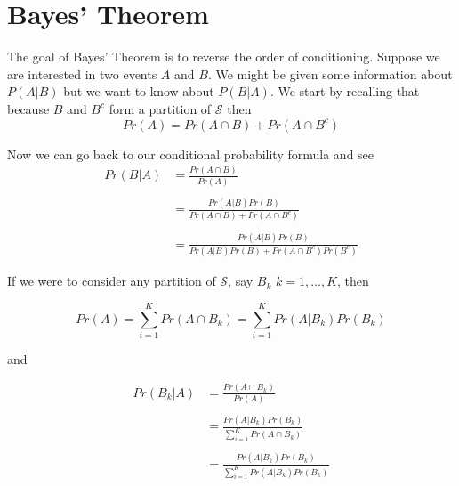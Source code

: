 \documentclass[]{book}
\begin{document}
\section{Bayes' Theorem}\label{bayes-theorem}

The goal of Bayes' Theorem is to reverse the order of conditioning.
Suppose we are interested in two events \(A\) and \(B\). We might be
given some information about \(P(A|B)\) but we want to know about
\(P(B|A)\). We start by recalling that because \(B\) and \(B^c\) form a
partition of \(\mathcal{S}\) then
\[Pr(A) = Pr(A \cap B) + Pr(A \cap B^c)\]

Now we can go back to our conditional probability formula and see
\[\begin{aligned} Pr(B|A) 
    &= \frac{Pr(A\cap B)}{Pr(A)}  \\ 
    &\\
    &= \frac{Pr(A|B)Pr(B)}{Pr(A\cap B)+Pr(A\cap B^c)} \\
    &\\
    &= \frac{Pr(A|B)Pr(B)}{Pr(A|B)Pr(B)+Pr(A\cap B^c)Pr(B^c)}
    \end{aligned}\]

If we were to consider any partition of \(\mathcal{S}\), say \(B_k\)
\(k=1,\dots,K\), then

\[Pr(A) = \sum_{i=1}^K Pr( A \cap B_k ) = \sum_{i=1}^K Pr(A | B_k)Pr(B_k)\]

and

\[\begin{aligned} Pr(B_k|A) 
    &= \frac{Pr(A\cap B_k)}{Pr(A)}  \\ 
    &\\
    &= \frac{Pr(A|B_k)Pr(B_k)}{\sum_{i=1}^K Pr(A\cap B_k)} \\
    &\\
    &= \frac{Pr(A|B_k)Pr(B_k)}{\sum_{i=1}^K Pr(A| B_k)Pr(B_k)}
    \end{aligned}\]
\end{document}
